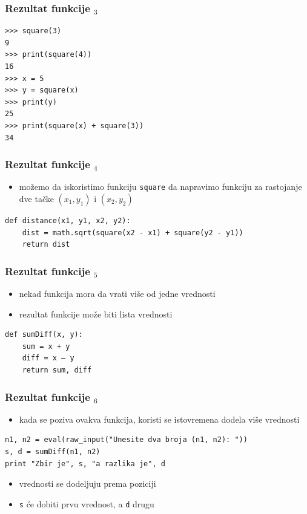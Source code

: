 \documentclass[compress]{beamer}
\begin{document}
\begin{frame}[fragile]
  \frametitle{Rezultat funkcije $_3$}
\begin{verbatim}
>>> square(3)
9
>>> print(square(4))
16
>>> x = 5
>>> y = square(x)
>>> print(y)
25
>>> print(square(x) + square(3))
34
\end{verbatim}
\end{frame}

\begin{frame}[fragile]
  \frametitle{Rezultat funkcije $_4$}
  \begin{itemize}
    \item možemo da iskoristimo funkciju \texttt{square} da napravimo funkciju za rastojanje dve tačke $(x_1,y_1)$ i $(x_2,y_2)$
  \end{itemize}
\begin{verbatim}
def distance(x1, y1, x2, y2):
    dist = math.sqrt(square(x2 - x1) + square(y2 - y1))
    return dist
\end{verbatim}
\end{frame}

\begin{frame}[fragile]
  \frametitle{Rezultat funkcije $_5$}
  \begin{itemize}
    \item nekad funkcija mora da vrati više od jedne vrednosti
    \item rezultat funkcije može biti lista vrednosti
  \end{itemize}
\begin{verbatim}
def sumDiff(x, y):
    sum = x + y
    diff = x – y
    return sum, diff
\end{verbatim}
\end{frame}

\begin{frame}[fragile,shrink=5]
  \frametitle{Rezultat funkcije $_6$}
  \begin{itemize}
    \item kada se poziva ovakva funkcija, koristi se istovremena dodela više vrednosti
  \end{itemize}
\begin{verbatim}
n1, n2 = eval(raw_input("Unesite dva broja (n1, n2): "))
s, d = sumDiff(n1, n2)
print "Zbir je", s, "a razlika je", d
\end{verbatim}
  \begin{itemize}
    \item vrednosti se dodeljuju prema poziciji
    \item \texttt{s} će dobiti prvu vrednost, a \texttt{d} drugu
  \end{itemize}
\end{frame}
\end{document}
